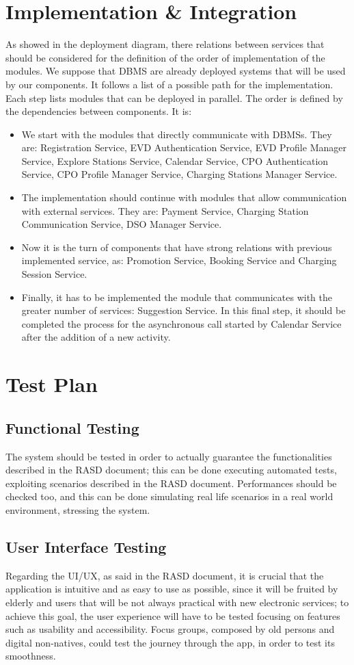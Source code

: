 \section{Implementation \& Integration}
\label{sec: implementation}%
As showed in the deployment diagram, there relations between services that should be considered for the definition of
the order of implementation of the modules.
We suppose that DBMS are already deployed systems that will be used by our components.
It follows a list of a possible path for the implementation.
Each step lists modules that can be deployed in parallel.
The order is defined by the dependencies between components.
It is:
\begin{itemize}
    \item We start with the modules that directly communicate with DBMSs. They are: Registration Service,
    EVD Authentication Service, EVD Profile Manager Service, Explore Stations Service, Calendar Service, CPO Authentication Service,
    CPO Profile Manager Service, Charging Stations Manager Service.
    \item The implementation should continue with modules that allow communication with external services.
    They are: Payment Service, Charging Station Communication Service, DSO Manager Service.
    \item Now it is the turn of components that have strong relations with previous implemented service, as:
    Promotion Service, Booking Service and Charging Session Service.
    \item Finally, it has to be implemented the module that communicates with the greater number of services: Suggestion Service.
    In this final step, it should be completed the process for the asynchronous call started by Calendar Service
    after the addition of a new activity.
\end{itemize}


\section{Test Plan}
\label{sec: test_plan}%
\subsection{Functional Testing}
The system should be tested in order to actually guarantee the functionalities described in the RASD document; this can be done executing automated tests, exploiting scenarios described in the RASD document.
Performances should be checked too, and this can be done simulating real life scenarios in a real world environment, stressing the system.
\subsection{User Interface Testing}
Regarding the UI/UX, as said in the RASD document, it is crucial that the application is intuitive and as easy to use as possible, since it will be fruited by elderly and users that will be not always practical with new electronic services; to achieve this goal, the user experience will have to be tested focusing on features such as usability and accessibility. Focus groups, composed by old persons and digital non-natives, could test the journey through the app, in order to test its smoothness.